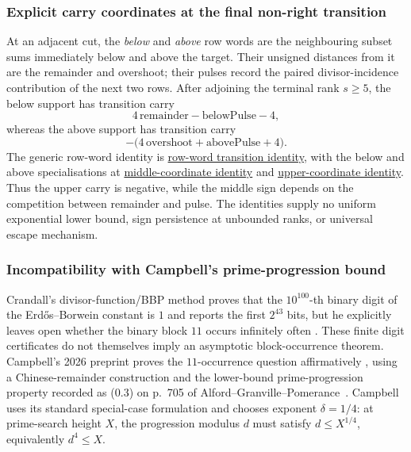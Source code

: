 \documentclass[11pt]{article}
\newcommand{\commit}{bb4e24651b37cd096d3749ef299c3317930b3a3b}
\newcommand{\repobase}{https://github.com/wcook04/plectis-lean-erdos249-257/blob/\commit}
\newcommand{\PK}{Erdos249257}
\newcommand{\lword}[4]{\href{\repobase/\PK/#1\#L#2}{#4}}
\theoremstyle{definition}
\theoremstyle{remark}
\begin{document}
{\subsubsection{Explicit carry coordinates at the final non-right transition}
\label{res:producercarrycoordinates}

At an adjacent cut, the \emph{below} and \emph{above} row words are the
neighbouring subset sums immediately below and above the target.  Their
unsigned distances from it are the remainder and overshoot; their pulses
record the paired divisor-incidence contribution of the next two rows.
After adjoining the terminal rank \(s\ge5\), the below support has transition
carry
\[
  4\,\mathrm{remainder}-\mathrm{belowPulse}-4,
\]
whereas the above support has transition carry
\[
  -\bigl(4\,\mathrm{overshoot}+\mathrm{abovePulse}+4\bigr).
\]
The generic row-word identity is
\lword{HalfCylinderProducerLowerBound.lean}{105}{producerCarry_insert_seamWordSupport_eq}{row-word transition identity},
with the below and above specialisations at
\lword{HalfCylinderProducerLowerBound.lean}{150}{producerCarry_insert_seamBelowSupport_eq_middleCoordinate}{middle-coordinate identity}
and
\lword{HalfCylinderProducerLowerBound.lean}{183}{producerCarry_insert_seamAboveSupport_eq_neg_upperCoordinate}{upper-coordinate identity}.
Thus the upper carry is negative, while the middle sign depends on the
competition between remainder and pulse.  The identities supply no uniform
exponential lower bound, sign persistence at unbounded ranks, or universal
escape mechanism.

\subsubsection{Incompatibility with Campbell's prime-progression bound}
\label{res:campbellboundary}

Crandall's divisor-function/BBP method proves that the
\(10^{100}\)-th binary digit of the Erd\H{o}s--Borwein constant is \(1\)
and reports the first \(2^{43}\) bits, but he explicitly leaves open whether
the binary block \(11\) occurs infinitely often
\cite[\S\S5--7, open-PDF pp.~6--9]{crandall}.  These finite digit
certificates do not themselves imply an asymptotic block-occurrence theorem.
Campbell's 2026 preprint proves the \(11\)-occurrence question affirmatively
\cite[Theorem~1, p.~12; proof
pp.~12--24]{campbell}, using a Chinese-remainder
construction and the lower-bound prime-progression property recorded as
(0.3) on p.~705 of
Alford--Granville--Pomerance~\cite[p.~705, (0.3)]{alfordgranvillepomerance}.
Campbell uses its standard special-case formulation and chooses
exponent \(\delta=1/4\): at prime-search height \(X\), the progression
modulus \(d\) must satisfy \(d\le X^{1/4}\), equivalently \(d^4\le X\).

}
\end{document}
